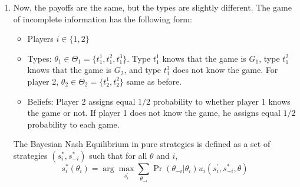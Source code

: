 \documentclass[11pt]{article}
\begin{document}
\begin{enumerate}
\begin{enumerate}
		In order to find the Bayesian Nash Equilibrium of this game, I note that player one chooses one strategy for both games, while player 2 chooses a strategy for $ G_1 $ and a strategy for $ G_2 $. Because each game occurs with probability $ 1/2 $, I combine them into one game as follows:
		\begin{table}[!htbp]
			\centering
			\setlength{\extrarowheight}{2pt}
			\begin{tabular}{cc|c|c|c|c|c|}
				& \multicolumn{1}{c}{} & \multicolumn{1}{c}{$b_1 b_1$}  & \multicolumn{1}{c}{$b_1 b_2$}  & \multicolumn{1}{c}{$b_2 b_1$} & \multicolumn{1}{c}{$b_2 b_2$}\\\cline{3-6} 
				& $a_1$ & $ 3,0 $ & $ \frac{3}{2}, \frac{1}{2} $ & $  \frac{3}{2}, \frac{1}{2} $ & $ 0,1 $ \\\cline{3-6}
				& $a_2$ & $ 0,\frac{1}{2} $ & $ \frac{3}{2}, 0 $ & $ \frac{3}{2}, 1 $ & $ 3, \frac{1}{2} $ \\\cline{3-6}
				& $a_3$ & $ 2,1 $ & $ 2,0 $ & $ 2, \frac{3}{2} $ & $ 2, \frac{1}{2} $ \\\cline{3-6}
			\end{tabular}
		\end{table}
	
		The Bayesian Nash Equilibrium for this game is thus $ P_1: a_3 $, $ P_2: b_2 b_1 $. 
	
		\item Now, the payoffs are the same, but the types are slightly different. The game of incomplete information has the following form:
		\begin{itemize}
			\item Players $ i\in\{1,2\} $
			\item Types: $ \theta_1\in\Theta_1 = \{t_1^1, t_1^2, t_1^3\} $. Type $ t_1^1 $ knows that the game is $ G_1 $, type $ t_1^2 $ knows that the game is $ G_2 $, and type $ t_1^3 $ does not know the game. For player 2, $ \theta_2\in\Theta_2 = \{t_2^1, t_2^2\} $ same as before.
			\item Beliefs: Player 2 assigns equal $ 1/2 $ probability to whether player 1 knows the game or not. If player 1 does not know the game, he assigns equal $ 1/2  $ probability to each game. 
		\end{itemize}
		
		The Bayesian Nash Equilibrium in pure strategies is defined as a set of strategies $ (s^*_i, s^*_{-i}) $ such that for all $ \theta $ and $ i $,
		\[s^*_i(\theta_i) = \arg\max_{s_i^\prime}\sum_{\theta_{-i}}\Pr(\theta_{-i}| \theta_i)u_i(s_i^\prime, s^*_{-i}, \theta) \]
		

\end{enumerate}
\end{enumerate}
\end{document}

